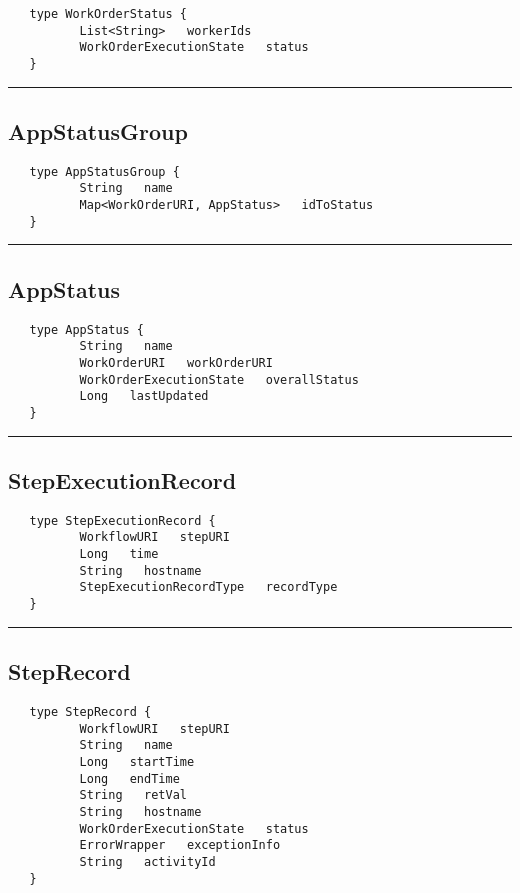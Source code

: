 \begin{verbatim}
   type WorkOrderStatus {
          List<String>   workerIds
          WorkOrderExecutionState   status
   }
\end{verbatim}

\rule{15cm}{2pt}
\subsection{AppStatusGroup}
\label{type:AppStatusGroup}

\begin{verbatim}
   type AppStatusGroup {
          String   name
          Map<WorkOrderURI, AppStatus>   idToStatus
   }
\end{verbatim}

\rule{15cm}{2pt}
\subsection{AppStatus}
\label{type:AppStatus}

\begin{verbatim}
   type AppStatus {
          String   name
          WorkOrderURI   workOrderURI
          WorkOrderExecutionState   overallStatus
          Long   lastUpdated
   }
\end{verbatim}

\rule{15cm}{2pt}
\subsection{StepExecutionRecord}
\label{type:StepExecutionRecord}

\begin{verbatim}
   type StepExecutionRecord {
          WorkflowURI   stepURI
          Long   time
          String   hostname
          StepExecutionRecordType   recordType
   }
\end{verbatim}

\rule{15cm}{2pt}
\subsection{StepRecord}
\label{type:StepRecord}

\begin{verbatim}
   type StepRecord {
          WorkflowURI   stepURI
          String   name
          Long   startTime
          Long   endTime
          String   retVal
          String   hostname
          WorkOrderExecutionState   status
          ErrorWrapper   exceptionInfo
          String   activityId
   }
\end{verbatim}

